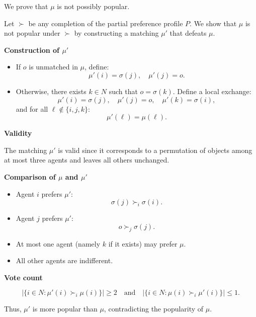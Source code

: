\documentclass{article}
\begin{document}
We prove that $\mu$ is not possibly popular.

Let $\succ$ be any completion of the partial preference profile $P$. We show that $\mu$ is not popular under $\succ$ by constructing a matching $\mu'$ that defeats $\mu$.

\medskip

\textbf{Construction of $\mu'$}

\begin{itemize}
    \item If $o$ is unmatched in $\mu$, define:
    \[
    \mu'(i) = \sigma(j), \quad \mu'(j) = o.
    \]
    
    \item Otherwise, there exists $k \in N$ such that $o = \sigma(k)$. Define a local exchange:
    \[
    \mu'(i) = \sigma(j), \quad
    \mu'(j) = o, \quad
    \mu'(k) = \sigma(i),
    \]
    and for all $\ell \notin \{i,j,k\}$:
    \[
    \mu'(\ell) = \mu(\ell).
    \]
\end{itemize}

\medskip

\textbf{Validity}

The matching $\mu'$ is valid since it corresponds to a permutation of objects among at most three agents and leaves all others unchanged.

\medskip

\textbf{Comparison of $\mu$ and $\mu'$}

\begin{itemize}
    \item Agent $i$ prefers $\mu'$:
    \[
    \sigma(j) \succ_i \sigma(i).
    \]
    
    \item Agent $j$ prefers $\mu'$:
    \[
    o \succ_j \sigma(j).
    \]
    
    \item At most one agent (namely $k$ if it exists) may prefer $\mu$.
    
    \item All other agents are indifferent.
\end{itemize}

\medskip

\textbf{Vote count}

\[
|\{i \in N : \mu'(i) \succ_i \mu(i)\}| \ge 2
\quad \text{and} \quad
|\{i \in N : \mu(i) \succ_i \mu'(i)\}| \le 1.
\]

Thus, $\mu'$ is more popular than $\mu$, contradicting the popularity of $\mu$.
\end{document}

